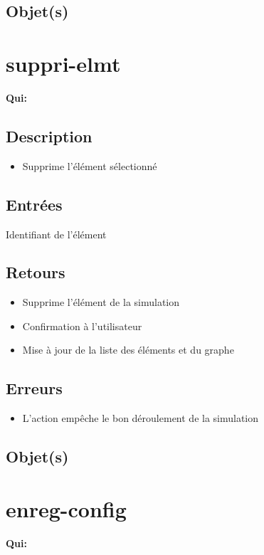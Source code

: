 	\subsection{Objet(s)}
		\allobjs

\section{suppri-elmt}
	\textbf{Qui:} \urt

	\subsection{Description}
	\begin{itemize}
		\item Supprime l'élément sélectionné
	\end{itemize}

	\subsection{Entrées}
		Identifiant de l'élément

	\subsection{Retours}
	\begin{itemize}
		\item Supprime l'élément de la simulation
		\item Confirmation à l'utilisateur
		\item Mise à jour de la liste des éléments et du graphe 
	\end{itemize}

	\subsection{Erreurs}
	\begin{itemize}
		\item L'action empêche le bon déroulement de la simulation \warning
	\end{itemize}

	\subsection{Objet(s)}
		\allobjs

\section{enreg-config}
	\textbf{Qui:} \urt

